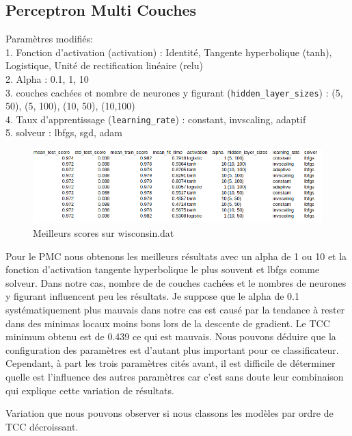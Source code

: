 \documentclass[10pt,letterpaper]{article}
\begin{document}
\subsection*{Perceptron Multi Couches}
Paramètres modifiés:\\
    1. Fonction d’activation (activation) : Identité, Tangente hyperbolique (tanh), Logistique, Unité de rectification linéaire (relu)\\
    2. Alpha : 0.1, 1, 10\\
    3. couches cachées et nombre de neurones y figurant (\verb!hidden_layer_sizes!) : (5, 50), (5, 100), (10, 50), (10,100)\\
    4. Taux d’apprentissage (\verb!learning_rate!) : constant, invscaling, adaptif\\
    5.  solveur : lbfgs, sgd, adam\\


\begin{figure}[H]
\centering
\includegraphics[scale=0.65]{images/wisc_pmc_1.png}
\caption{Meilleurs scores sur wisconsin.dat}
\end{figure}

Pour le PMC nous obtenons les meilleurs résultats avec un alpha de 1 ou 10 et la fonction d’activation tangente hyperbolique le plus souvent et lbfgs comme solveur.
Dans notre cas, nombre de de couches cachées et le nombres de neurones y figurant influencent peu les résultats.
Je suppose que le alpha de 0.1 systématiquement plus mauvais dans notre cas est causé par la tendance à rester dans des minimas locaux moins bons lors de la descente de gradient.
\newpage
Le TCC minimum obtenu est de 0.439 ce qui est mauvais. Nous pouvons déduire que la configuration des paramètres est d’autant plus important pour ce classificateur. Cependant, à part les trois paramètres cités avant, il est difficile de déterminer quelle est l’influence des autres paramètres car c’est sans doute leur combinaison qui explique cette variation de résultats.

Variation que nous pouvons observer si nous classons les modèles par ordre de TCC décroissant.
\end{document}
